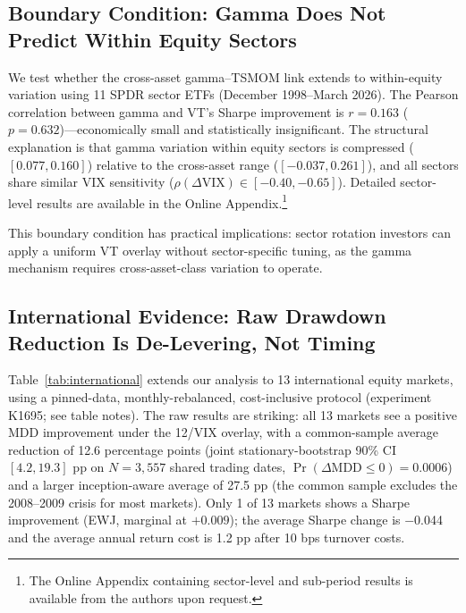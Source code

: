 \subsection{Boundary Condition: Gamma Does Not Predict Within Equity Sectors}

We test whether the cross-asset gamma--TSMOM link extends to within-equity variation using 11 SPDR sector ETFs (December 1998--March 2026). The Pearson correlation between gamma and VT's Sharpe improvement is $r = 0.163$ ($p = 0.632$)---economically small and statistically insignificant. The structural explanation is that gamma variation within equity sectors is compressed ($[0.077, 0.160]$) relative to the cross-asset range ($[-0.037, 0.261]$), and all sectors share similar VIX sensitivity ($\rho(\Delta\text{VIX}) \in [-0.40, -0.65]$). Detailed sector-level results are available in the Online Appendix.\footnote{The Online Appendix containing sector-level and sub-period results is available from the authors upon request.}

This boundary condition has practical implications: sector rotation investors can apply a uniform VT overlay without sector-specific tuning, as the gamma mechanism requires cross-asset-class variation to operate.


\subsection{International Evidence: Raw Drawdown Reduction Is De-Levering, Not Timing}
\label{sec:international}

Table~\ref{tab:international} extends our analysis to 13 international equity markets, using a pinned-data, monthly-rebalanced, cost-inclusive protocol (experiment K1695; see table notes). The raw results are striking: all 13 markets see a positive MDD improvement under the 12/VIX overlay, with a common-sample average reduction of 12.6 percentage points (joint stationary-bootstrap 90\% CI $[4.2, 19.3]$ pp on $N = 3{,}557$ shared trading dates, $\Pr(\Delta\text{MDD} \le 0) = 0.0006$) and a larger inception-aware average of 27.5 pp (the common sample excludes the 2008--2009 crisis for most markets). Only 1 of 13 markets shows a Sharpe improvement (EWJ, marginal at $+0.009$); the average Sharpe change is $-$0.044 and the average annual return cost is 1.2 pp after 10 bps turnover costs.

